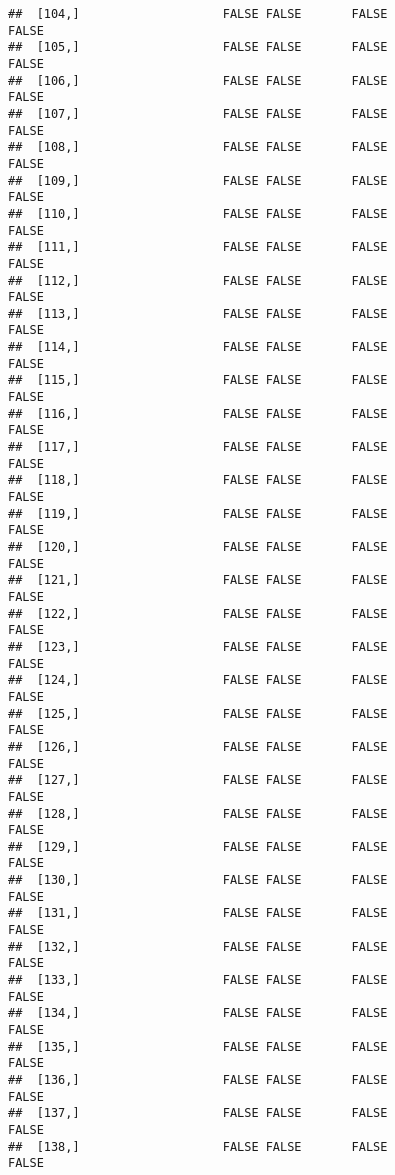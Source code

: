 \documentclass[
]{article}
\begin{document}
\begin{verbatim}
##  [104,]                    FALSE FALSE       FALSE                FALSE
##  [105,]                    FALSE FALSE       FALSE                FALSE
##  [106,]                    FALSE FALSE       FALSE                FALSE
##  [107,]                    FALSE FALSE       FALSE                FALSE
##  [108,]                    FALSE FALSE       FALSE                FALSE
##  [109,]                    FALSE FALSE       FALSE                FALSE
##  [110,]                    FALSE FALSE       FALSE                FALSE
##  [111,]                    FALSE FALSE       FALSE                FALSE
##  [112,]                    FALSE FALSE       FALSE                FALSE
##  [113,]                    FALSE FALSE       FALSE                FALSE
##  [114,]                    FALSE FALSE       FALSE                FALSE
##  [115,]                    FALSE FALSE       FALSE                FALSE
##  [116,]                    FALSE FALSE       FALSE                FALSE
##  [117,]                    FALSE FALSE       FALSE                FALSE
##  [118,]                    FALSE FALSE       FALSE                FALSE
##  [119,]                    FALSE FALSE       FALSE                FALSE
##  [120,]                    FALSE FALSE       FALSE                FALSE
##  [121,]                    FALSE FALSE       FALSE                FALSE
##  [122,]                    FALSE FALSE       FALSE                FALSE
##  [123,]                    FALSE FALSE       FALSE                FALSE
##  [124,]                    FALSE FALSE       FALSE                FALSE
##  [125,]                    FALSE FALSE       FALSE                FALSE
##  [126,]                    FALSE FALSE       FALSE                FALSE
##  [127,]                    FALSE FALSE       FALSE                FALSE
##  [128,]                    FALSE FALSE       FALSE                FALSE
##  [129,]                    FALSE FALSE       FALSE                FALSE
##  [130,]                    FALSE FALSE       FALSE                FALSE
##  [131,]                    FALSE FALSE       FALSE                FALSE
##  [132,]                    FALSE FALSE       FALSE                FALSE
##  [133,]                    FALSE FALSE       FALSE                FALSE
##  [134,]                    FALSE FALSE       FALSE                FALSE
##  [135,]                    FALSE FALSE       FALSE                FALSE
##  [136,]                    FALSE FALSE       FALSE                FALSE
##  [137,]                    FALSE FALSE       FALSE                FALSE
##  [138,]                    FALSE FALSE       FALSE                FALSE

\end{verbatim}
\end{document}
